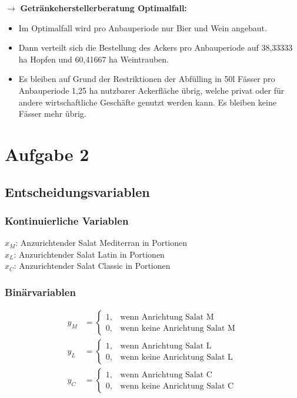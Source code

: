 \documentclass[a4paper,11pt]{article}
\begin{document}
$\to$ \textbf{Getränkeherstellerberatung Optimalfall:} \\
\begin{itemize}
    \item Im Optimalfall wird pro Anbauperiode nur Bier und Wein angebaut. \\
    \item Dann verteilt sich die Bestellung des Ackers pro Anbauperiode auf 38,33333 ha Hopfen und 60,41667 ha Weintrauben. \\
    \item Es bleiben auf Grund der Restriktionen der Abfülling in 50l Fässer pro Anbauperiode 1,25 ha nutzbarer Ackerfläche übrig, welche privat oder für andere wirtschaftliche Geschäfte genutzt werden kann. Es bleiben keine Fässer mehr übrig.
\end{itemize}

\section*{Aufgabe 2}

\subsection*{Entscheidungsvariablen}
\subsubsection*{Kontinuierliche Variablen}
$x_{M}$: Anzurichtender Salat Mediterran in Portionen \\
$x_{L}$: Anzurichtender Salat Latin in Portionen \\
$x_{C}$: Anzurichtender Salat Classic in Portionen \\
\pagebreak

\subsubsection*{Binärvariablen}

\begin{align*}
y_M &= \begin{cases}
    1, & \text{wenn Anrichtung Salat M} \\
    0, & \text{wenn keine Anrichtung Salat M}
\end{cases} \\
y_L &= \begin{cases}
    1, & \text{wenn Anrichtung Salat L} \\
    0, & \text{wenn keine Anrichtung Salat L}
\end{cases} \\
y_C &= \begin{cases}
    1, & \text{wenn Anrichtung Salat C} \\
    0, & \text{wenn keine Anrichtung Salat C}
\end{cases}
\end{align*}
\end{document}
